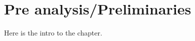 \graphicspath{{chapters/02Problem/figures}}

\chapter{Pre analysis/Preliminaries}\label{ch:preliminaries}
Here is the intro to the chapter.





